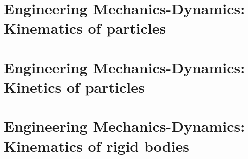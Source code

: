 \documentclass[]{book}
\begin{document}
\part{Engineering Mechanics-Dynamics: Kinematics of particles} %
	
	
\part{Engineering Mechanics-Dynamics: Kinetics of particles}
	
\part{Engineering Mechanics-Dynamics: Kinematics of rigid bodies}
\end{document}
